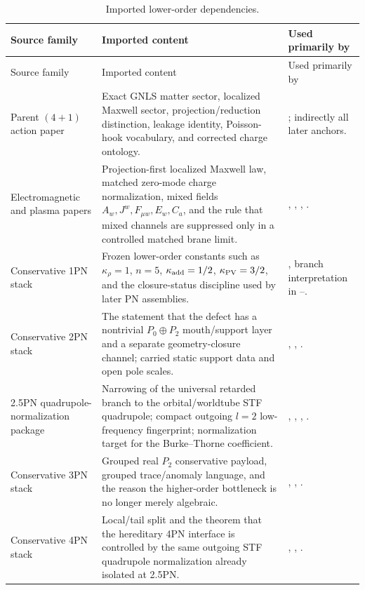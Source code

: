 \begin{longtable}{L{0.18\textwidth}L{0.38\textwidth}L{0.28\textwidth}}
\caption{Imported lower-order dependencies.}\label{tab:lower-order-imports}\\
\toprule
Source family & Imported content & Used primarily by \\
\midrule
\endfirsthead
\toprule
Source family & Imported content & Used primarily by \\
\midrule
\endhead
Parent \((4+1)\) action paper & Exact GNLS matter sector, localized Maxwell sector, projection/reduction distinction, leakage identity, Poisson-hook vocabulary, and corrected charge ontology. & ; indirectly all later anchors. \\
\addlinespace
Electromagnetic and plasma papers & Projection-first localized Maxwell law, matched zero-mode charge normalization, mixed fields \(A_w,J^w,F_{\mu w},E_w,C_a\), and the rule that mixed channels are suppressed only in a controlled matched brane limit. & , , , . \\
\addlinespace
Conservative 1PN stack & Frozen lower-order constants such as \(\kappa_\rho=1\), \(n=5\), \(\kappa_{\rm add}=1/2\), \(\kappa_{\rm PV}=3/2\), and the closure-status discipline used by later PN assemblies. & , branch interpretation in --. \\
\addlinespace
Conservative 2PN stack & The statement that the defect has a nontrivial \(P_0\oplus P_2\) mouth/support layer and a separate geometry-closure channel; carried static support data and open pole scales. & , , . \\
\addlinespace
2.5PN quadrupole-normalization package & Narrowing of the universal retarded branch to the orbital/worldtube STF quadrupole; compact outgoing \(l=2\) low-frequency fingerprint; normalization target for the Burke--Thorne coefficient. & , , , . \\
\addlinespace
Conservative 3PN stack & Grouped real \(P_2\) conservative payload, grouped trace/anomaly language, and the reason the higher-order bottleneck is no longer merely algebraic. & , , . \\
\addlinespace
Conservative 4PN stack & Local/tail split and the theorem that the hereditary 4PN interface is controlled by the same outgoing STF quadrupole normalization already isolated at 2.5PN. & , , . \\

\end{longtable}
